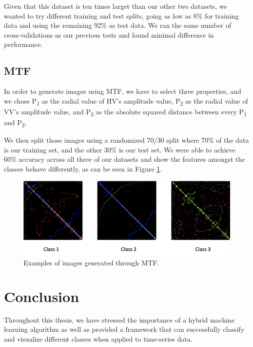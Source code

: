 \documentclass{turabian-thesis}
\begin{document}
Given that this dataset is ten times larget than our other two datasets, we wanted to try different training and test splits, going as low as 8\% for training data and using the remaining 92\% as test data. We ran the same number of cross-validations as our previous tests and found minimal difference in performance.



\section{ MTF }
 
In order to generate images using MTF, we have to select three properties, and we chose P\textsubscript{1} as the radial value of HV's amplitude value, P\textsubscript{2} as the radial value of VV's amplitude value, and P\textsubscript{3} as the absolute squared distance between every P\textsubscript{1} and P\textsubscript{2}. 

We then split those images using a randomized 70/30 split where 70\% of the data is our training set, and the other 30\% is our test set. We were able to achieve 60\% accuracy across all three of our datasets and show the features amongst the classes behave differently, as can be seen in Figure \ref{fig:whitebox_images}.

\begin{figure}[h!]
   \begin{center}
      \includegraphics[scale=0.5]{../media/whitebox_images.png}
   \end{center}
   \caption{Examples of images generated through MTF.}
   \label{fig:whitebox_images}
\end{figure}


\chapter{Conclusion}
\label{chap:conclusion}
Throughout this thesis, we have stressed the importance of a hybrid machine learning algorithm as well as provided a framework that can successfully classify and visualize different classes when applied to time-series data. 
\end{document}
